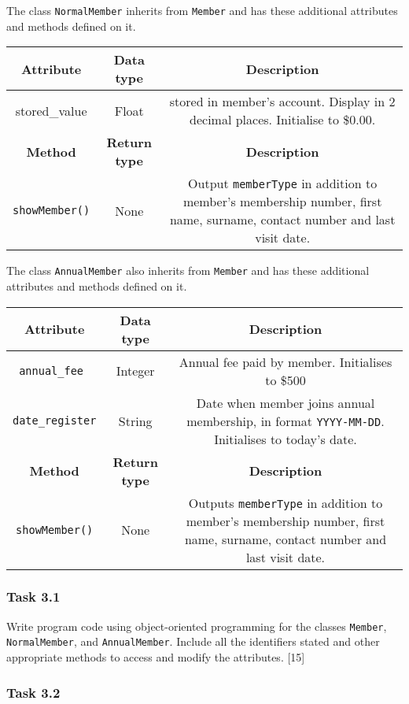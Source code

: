 The class \texttt{NormalMember} inherits from \texttt{Member} and
has these additional attributes and methods defined on it. 

\begin{tabular}{|c|c|c|}
\hline 
\textbf{Attribute} & \textbf{Data type} & \textbf{Description}\tabularnewline
\hline 
stored\_value & Float & stored in member\textquoteright s account. Display in 2 decimal places.
Initialise to \$0.00.\tabularnewline
\hline 
\textbf{Method} & \textbf{Return type} & \textbf{Description}\tabularnewline
\hline 
\texttt{showMember()} & None & Output \texttt{memberType} in addition to member\textquoteright s
membership number, first name, surname, contact number and last visit
date. \tabularnewline
\hline 
\end{tabular}

The class \texttt{AnnualMember} also inherits from \texttt{Member}
and has these additional attributes and methods defined on it. 

\begin{tabular}{|c|c|c|}
\hline 
\textbf{Attribute} & \textbf{Data type} & \textbf{Description}\tabularnewline
\hline 
\texttt{annual\_fee } & Integer  & Annual fee paid by member. Initialises to \$500\tabularnewline
\hline 
\texttt{date\_register} & String & Date when member joins annual membership, in format \texttt{YYYY-MM-DD}.
Initialises to today\textquoteright s date.\tabularnewline
\hline 
\textbf{Method} & \textbf{Return type} & \textbf{Description}\tabularnewline
\hline 
\texttt{showMember()} & None & Outputs \texttt{memberType} in addition to member\textquoteright s
membership number, first name, surname, contact number and last visit
date. \tabularnewline
\hline 
\end{tabular}

\subsubsection*{Task 3.1 }

Write program code using object-oriented programming for the classes
\texttt{Member}, \texttt{NormalMember}, and \texttt{AnnualMember}.
Include all the identifiers stated and other appropriate methods to
access and modify the attributes. \hfill{}{[}15{]}

\subsubsection*{Task 3.2 }

